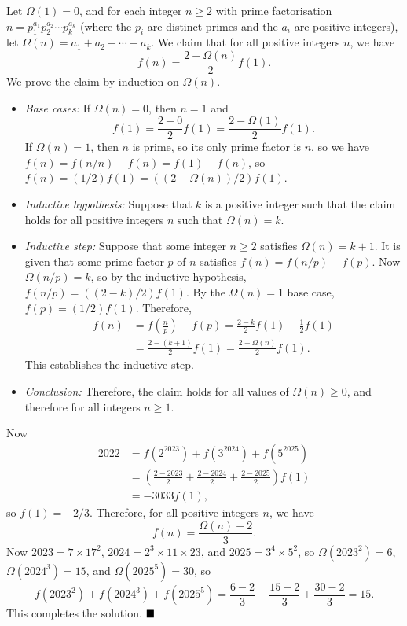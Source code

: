 \documentclass[12pt]{article}
\begin{document}
\begin{enumerate}[topsep=2\bigskipamount,itemsep=\bigskipamount]
Let \(\Omega(1) = 0\), and for each integer \(n \geqslant 2\) with prime factorisation \(n = p_{1}^{a_{1}}p_{2}^{a_{2}}\cdots{}p_{k}^{a_{k}}\) (where the \(p_{i}\) are distinct primes and the \(a_{i}\) are positive integers), let \(\Omega(n) = a_{1} + a_{2} + \cdots{} + a_{k}\). We claim that for all positive integers \(n\), we have
\[f(n) = \frac{2 - \Omega(n)}{2}f(1).\]
We prove the claim by induction on \(\Omega(n)\).
\begin{itemize}
\item \textit{Base cases:} If \(\Omega(n) = 0\), then \(n = 1\) and
\[f(1) = \frac{2 - 0}{2}f(1) = \frac{2 - \Omega(1)}{2}f(1).\]
If \(\Omega(n) = 1\), then \(n\) is prime, so its only prime factor is \(n\), so we have \(f(n) = f(n/n) - f(n) = f(1) - f(n)\), so \(f(n) = (1/2)f(1) = ((2 - \Omega(n))/2)f(1)\).
\item \textit{Inductive hypothesis:} Suppose that \(k\) is a positive integer such that the claim holds for all positive integers \(n\) such that \(\Omega(n) = k\).
\item \textit{Inductive step:} Suppose that some integer \(n \geqslant 2\) satisfies \(\Omega(n) = k + 1\). It is given that some prime factor \(p\) of \(n\) satisfies \(f(n) = f(n/p) - f(p)\). Now \(\Omega(n/p) = k\), so by the inductive hypothesis, \(f(n/p) = ((2 - k)/2)f(1)\). By the \(\Omega(n) = 1\) base case, \(f(p) = (1/2)f(1)\). Therefore,
\[\begin{aligned}
f(n) & = f\left(\frac{n}{p}\right) - f(p) = \frac{2 - k}{2}f(1) - \frac{1}{2}f(1)\\
& = \frac{2 - (k + 1)}{2}f(1) = \frac{2 - \Omega(n)}{2}f(1).
\end{aligned}\]
This establishes the inductive step.
\item \textit{Conclusion:} Therefore, the claim holds for all values of \(\Omega(n) \geqslant 0\), and therefore for all integers \(n \geqslant 1\).
\end{itemize}
Now
\[\begin{aligned}
2022 & = f(2^{2023}) + f(3^{2024}) + f(5^{2025})\\
& = \left(\frac{2 - 2023}{2} + \frac{2 - 2024}{2} + \frac{2 - 2025}{2}\right)f(1)\\
& = -3033f(1),
\end{aligned}\]
so \(f(1) = -2/3\). Therefore, for all positive integers \(n\), we have
\[f(n) = \frac{\Omega(n) - 2}{3}.\]
Now \(2023 = 7 \times 17^{2}\), \(2024 = 2^{3} \times 11 \times 23\), and \(2025 = 3^{4} \times 5^{2}\), so \(\Omega(2023^{2}) = 6\), \(\Omega(2024^{3}) = 15\), and \(\Omega(2025^{5}) = 30\), so
\[f(2023^{2}) + f(2024^{3}) + f(2025^{5}) = \frac{6 - 2}{3} + \frac{15 - 2}{3} + \frac{30 - 2}{3} = 15.\]
This completes the solution. $\hfill\blacksquare$
\end{enumerate}
\end{document}
